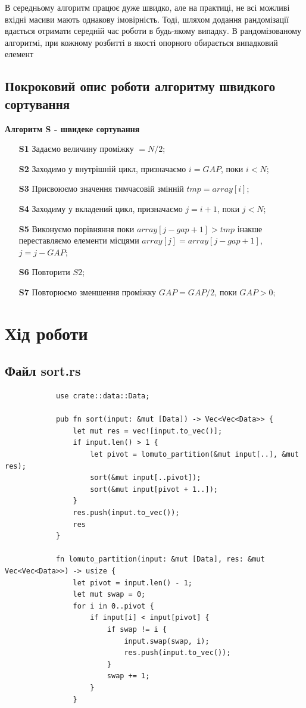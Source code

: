 \documentclass{article}
\begin{document}
\begin{normalsize}
		В середньому алгоритм працює дуже швидко, але на практиці, не всі можливі вхідні масиви мають однакову імовірність. Тоді, шляхом додання рандомізації вдається отримати середній час роботи в будь-якому випадку. В рандомізованому алгоритмі, при кожному розбитті в якості опорного обирається випадковий елемент
		
		\subsection*{Покроковий опис роботи алгоритму швидкого сортування}
		\textbf{Алгоритм S - швидеке сортування}
		\begin{enumerate}
			\item [\textbf{S1}] Задаємо величину проміжку $= N/2$;
			\item [\textbf{S2}] Заходимо у внутрішній цикл, призначаємо $i = GAP$, поки $i < N$;
			\item [\textbf{S3}] Присвоюємо значення тимчасовій змінній $tmp=array[i]$;
			\item [\textbf{S4}] Заходиму у вкладений цикл, призначаємо $j=i+1$, поки $j<N$;
			\item [\textbf{S5}] Виконуємо порівняння поки $array[j-gap+1]>tmp$ інакше переставляємо елементи місцями $array[j]=array[j-gap+1]$, $j=j-GAP$;
			\item [\textbf{S6}] Повторити $S2$;
			\item [\textbf{S7}] Повторюємо зменшення проміжку $GAP=GAP/2$, поки $GAP > 0 $;
		\end{enumerate}
		
		\newpage
		
		\section*{Хід роботи}
		\subsection*{Файл sort.rs}
		\begin{lstlisting}
			use crate::data::Data;
			
			pub fn sort(input: &mut [Data]) -> Vec<Vec<Data>> {
				let mut res = vec![input.to_vec()];
				if input.len() > 1 {
					let pivot = lomuto_partition(&mut input[..], &mut res);
					sort(&mut input[..pivot]);
					sort(&mut input[pivot + 1..]);
				}
				res.push(input.to_vec());
				res
			}
			
			fn lomuto_partition(input: &mut [Data], res: &mut Vec<Vec<Data>>) -> usize {
				let pivot = input.len() - 1;
				let mut swap = 0;
				for i in 0..pivot {
					if input[i] < input[pivot] {
						if swap != i {
							input.swap(swap, i);
							res.push(input.to_vec());
						}
						swap += 1;
					}
				}
				

\end{lstlisting}
\end{normalsize}
\end{document}
